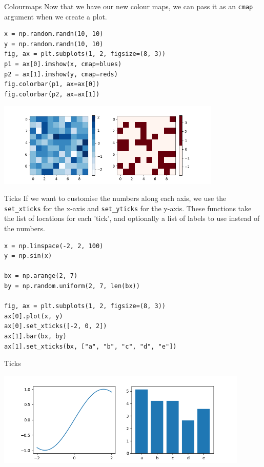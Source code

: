 \documentclass[10pt]{beamer}
\begin{document}
\begin{frame}[label={sec:org4b10a77},fragile]{Colourmaps}
 Now that we have our new colour maps, we can pass it as an \texttt{cmap} argument when we
create a plot.

\begin{verbatim}
x = np.random.randn(10, 10)
y = np.random.randn(10, 10)
fig, ax = plt.subplots(1, 2, figsize=(8, 3))
p1 = ax[0].imshow(x, cmap=blues)
p2 = ax[1].imshow(y, cmap=reds)
fig.colorbar(p1, ax=ax[0])
fig.colorbar(p2, ax=ax[1])
\end{verbatim}

\begin{center}
\includegraphics[width=0.8\textwidth]{images/colourmaps.png}
\end{center}
\end{frame}

\begin{frame}[label={sec:org9778339},fragile]{Ticks}
 If we want to customise the numbers along each axis, we use the \texttt{set\_xticks} for
the x-axis and \texttt{set\_yticks} for the y-axis. These functions take the list of
locations for each 'tick', and optionally a list of labels to use instead of the numbers.

\begin{verbatim}
x = np.linspace(-2, 2, 100)
y = np.sin(x)

bx = np.arange(2, 7)
by = np.random.uniform(2, 7, len(bx))

fig, ax = plt.subplots(1, 2, figsize=(8, 3))
ax[0].plot(x, y)
ax[0].set_xticks([-2, 0, 2])
ax[1].bar(bx, by)
ax[1].set_xticks(bx, ["a", "b", "c", "d", "e"])
\end{verbatim}
\end{frame}

\begin{frame}[label={sec:org925e795}]{Ticks}
\begin{center}
\includegraphics[width=0.9\textwidth]{images/ticks.png}
\end{center}
\end{frame}
\end{document}

